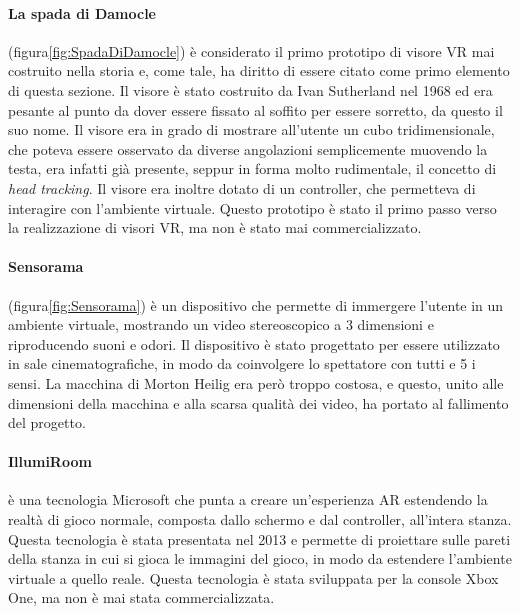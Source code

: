         \paragraph{La spada di Damocle} (figura\ref{fig:SpadaDiDamocle}) è considerato il primo prototipo di visore VR mai costruito nella storia e,
            come tale, ha diritto di essere citato come primo elemento di questa sezione. Il visore è stato costruito
            da Ivan Sutherland nel 1968 ed era pesante al punto da dover essere fissato al soffito per essere sorretto,
            da questo il suo nome. Il visore era in grado di mostrare all'utente un cubo tridimensionale, che poteva
            essere osservato da diverse angolazioni semplicemente muovendo la testa, era infatti già presente, seppur
            in forma molto rudimentale, il concetto di \textit{head tracking}. Il visore era inoltre dotato di un
            controller, che permetteva di interagire con l'ambiente virtuale. Questo prototipo è stato il primo passo
            verso la realizzazione di visori VR, ma non è stato mai commercializzato.

        \paragraph{Sensorama} (figura\ref{fig:Sensorama}) è un dispositivo che permette di immergere l'utente in un
            ambiente virtuale, mostrando un video stereoscopico a 3 dimensioni e riproducendo suoni e odori. Il dispositivo è stato
            progettato per essere utilizzato in sale cinematografiche, in modo da coinvolgere lo spettatore con tutti e 5 i sensi.
            La macchina di Morton Heilig era però troppo costosa, e questo, unito alle dimensioni della macchina e alla scarsa qualità
            dei video, ha portato al fallimento del progetto.

        \paragraph{IllumiRoom} è una tecnologia Microsoft che punta a creare un'esperienza AR estendendo la realtà di gioco
            normale, composta dallo schermo e dal controller, all'intera stanza. Questa tecnologia è stata presentata nel 2013
            e permette di proiettare sulle pareti della stanza in cui si gioca le immagini del gioco, in modo da estendere
            l'ambiente virtuale a quello reale. Questa tecnologia è stata sviluppata per la console Xbox One, ma non è mai
            stata commercializzata.\cite{Schmalstieg2016}
        
